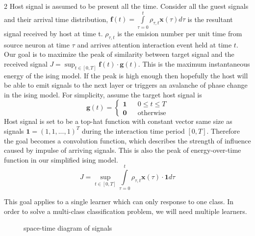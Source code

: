 \documentclass[11pt,a4paper]{article}
\begin{document}
\begin{multicols} {2}
  Host signal is assumed to be present all the time. 
  Consider all the guest signals and their arrival time distribution, $\boldsymbol{f}(t) = \int\limits_{\tau = 0}^{t} \rho_{\tau,t} \boldsymbol{x}(\tau) d\tau$ is the resultant signal received by host at time t. $\rho_{\tau,t}$ is the emision number per unit time from source neuron at time $\tau$ and arrives attention interaction event held at time $t$. 
  Our goal is to maximize the peak of similarity between target signal and the received signal $J=\sup_{t \in [0, T]}\boldsymbol{f}(t) \cdot \boldsymbol{g}(t)$. This is the maximum instantaneous energy of the ising model. If the peak is high enough then hopefully the host will be able to emit signals to the next layer or triggers an avalanche of phase change in the ising model. For simplicity, assume the target host signal is
  $$
    \boldsymbol{g}(t) =\left\{
    \begin{array}{rcl}
    \boldsymbol{1} &  & 0 \le t \le T\\
    \boldsymbol{0} &  & \text{otherwise}
    \end{array}
    \right.
  $$
  Host signal is set to be a top-hat function with constant vector same size as signals $\boldsymbol{1}=(1, 1, ..., 1)^T$ during the interaction time period $[0, T]$. 
  Therefore the goal becomes a convolution function, which describes the strength of influence caused by impulse of arriving signals. 
  This is also the peak of energy-over-time function in our simplified ising model.
  $$J=\sup_{t \in [0,T]} \int\limits_{\tau=0}^{t} \rho_{\tau,t} \boldsymbol{x}(\tau) \cdot \boldsymbol{1} d\tau$$

  This goal applies to a single learner which can only response to one class. In order to solve a multi-class classification problem, we will need multiple learners.
\end{multicols}

\begin{figure}[bth]
  \myfloatalign
  \caption{space-time diagram of signals} \label{fig:worldlines-gpt}
\end{figure}
\end{document}
